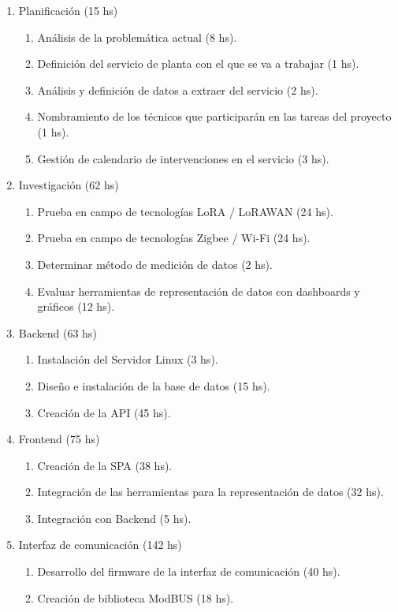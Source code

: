 \documentclass[
11pt, %
]{charter}
\begin{document}
\begin{enumerate}
\item Planificación (15 hs)
	\begin{enumerate}
	\item Análisis de la problemática actual (8 hs).
	\item Definición del servicio de planta con el que se va a trabajar (1 hs).
	\item Análisis y definición de datos a extraer del servicio (2 hs).
	\item Nombramiento de los técnicos que participarán en las tareas del proyecto (1 hs).
	\item Gestión de calendario de intervenciones en el servicio (3 hs).
	\end{enumerate}
\item Investigación (62 hs)
	\begin{enumerate}
	\item Prueba en campo de tecnologías LoRA / LoRAWAN (24 hs).
	\item Prueba en campo de tecnologías Zigbee / Wi-Fi (24 hs).
	\item Determinar método de medición de datos (2 hs).
	\item Evaluar herramientas de representación de datos con dashboards y gráficos (12 hs).
	\end{enumerate}
\item Backend (63 hs)
	\begin{enumerate}
	\item Instalación del Servidor Linux (3 hs).
	\item Diseño e instalación de la base de datos (15 hs).
	\item Creación de la API (45 hs).
	\end{enumerate}
\item Frontend (75 hs)
	\begin{enumerate}
	\item Creación de la SPA (38 hs).
	\item Integración de las herramientas para la representación de datos (32 hs).
	\item Integración con Backend (5 hs).
	\end{enumerate}
\item Interfaz de comunicación (142 hs)
	\begin{enumerate}
	\item Desarrollo del firmware de la interfaz de comunicación (40 hs).
	\item Creación de biblioteca ModBUS (18 hs).

\end{enumerate}
\end{enumerate}
\end{document}
